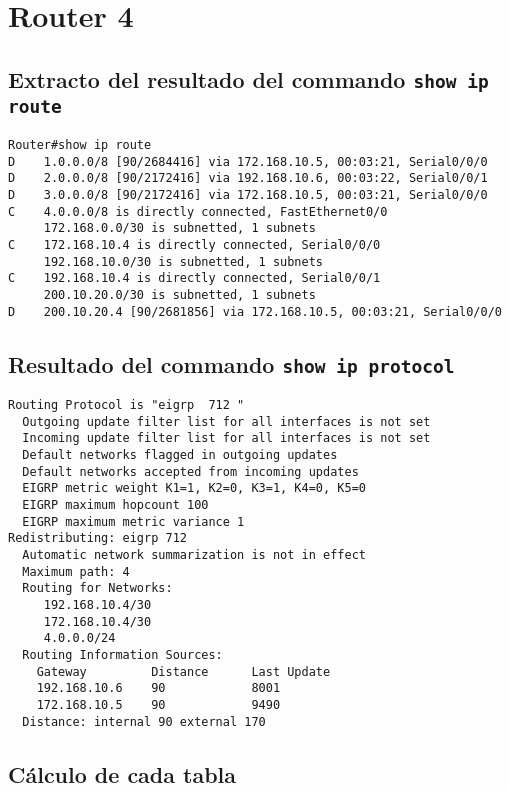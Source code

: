 \documentclass[12pt, times]{simauth}
\begin{document}
\section{Router 4}
\subsection{Extracto del resultado del commando \texttt{show ip route}}

\begin{verbatim}
Router#show ip route
D    1.0.0.0/8 [90/2684416] via 172.168.10.5, 00:03:21, Serial0/0/0
D    2.0.0.0/8 [90/2172416] via 192.168.10.6, 00:03:22, Serial0/0/1
D    3.0.0.0/8 [90/2172416] via 172.168.10.5, 00:03:21, Serial0/0/0
C    4.0.0.0/8 is directly connected, FastEthernet0/0
     172.168.0.0/30 is subnetted, 1 subnets
C    172.168.10.4 is directly connected, Serial0/0/0
     192.168.10.0/30 is subnetted, 1 subnets
C    192.168.10.4 is directly connected, Serial0/0/1
     200.10.20.0/30 is subnetted, 1 subnets
D    200.10.20.4 [90/2681856] via 172.168.10.5, 00:03:21, Serial0/0/0
\end{verbatim}

\subsection{Resultado del commando \texttt{show ip protocol}}
\begin{verbatim}
Routing Protocol is "eigrp  712 " 
  Outgoing update filter list for all interfaces is not set 
  Incoming update filter list for all interfaces is not set 
  Default networks flagged in outgoing updates  
  Default networks accepted from incoming updates 
  EIGRP metric weight K1=1, K2=0, K3=1, K4=0, K5=0
  EIGRP maximum hopcount 100
  EIGRP maximum metric variance 1
Redistributing: eigrp 712
  Automatic network summarization is not in effect  
  Maximum path: 4
  Routing for Networks:  
     192.168.10.4/30
     172.168.10.4/30
     4.0.0.0/24
  Routing Information Sources:  
    Gateway         Distance      Last Update 
    192.168.10.6    90            8001       
    172.168.10.5    90            9490       
  Distance: internal 90 external 170
\end{verbatim}

\subsection{Cálculo de cada tabla}
\end{document}
